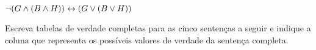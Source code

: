 \begin{earg}
\item $\neg(G \wedge (B \wedge H)) \leftrightarrow (G \vee (B \vee H))$
%


\end{earg}

\problempart
Escreva tabelas de verdade completas para as cinco sentenças a seguir e indique a coluna que representa os possíveis valores de verdade da sentença completa.

